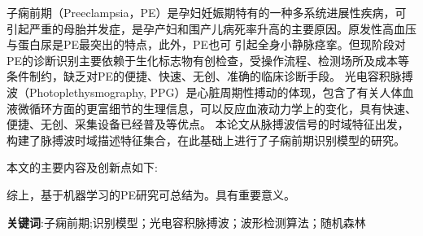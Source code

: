 \cleardoublepage
{}
子痫前期（Preeclampsia，PE）是孕妇妊娠期特有的一种多系统进展性疾病，可引起严重的母胎并发症，是孕产妇和围产儿病死率升高的主要原因。原发性高血压与蛋白尿是PE最突出的特点，此外，PE也可
引起全身小静脉痉挛。但现阶段对PE的诊断识别主要依赖于生化标志物有创检查，受操作流程、检测场所及成本等条件制约，缺乏对PE的便捷、快速、无创、准确的临床诊断手段。
光电容积脉搏波（Photoplethysmography, PPG）是心脏周期性搏动的体现，包含了有关人体血液微循环方面的更富细节的生理信息，可以反应血液动力学上的变化，具有快速、便捷、无创、采集设备已经普及等优点。
本论文从脉搏波信号的时域特征出发，构建了脉搏波时域描述特征集合，在此基础上进行了子痫前期识别模型的研究。


本文的主要内容及创新点如下:



综上，基于机器学习的PE研究可总结为。具有重要意义。


\textbf{关键词}:子痫前期;识别模型；光电容积脉搏波；波形检测算法；随机森林




\cleardoublepage
{}